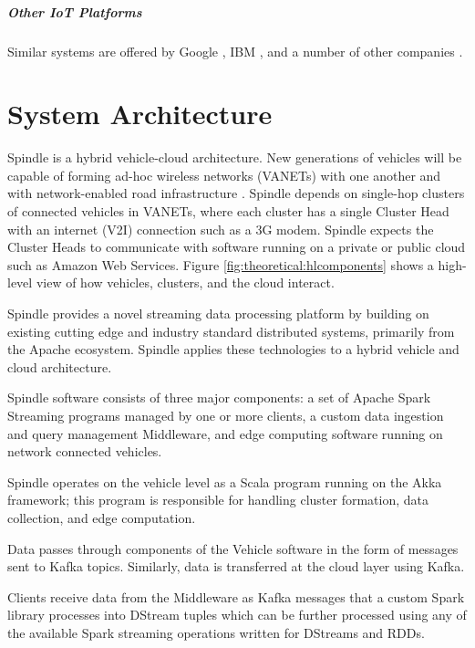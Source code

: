 \documentclass{thesis}
\begin{document}
        \paragraph{Other IoT Platforms}
            Similar systems are offered by Google \cite{google:iot}, IBM \cite{ibm:iot}, and a number of other companies
            \cite{forbes:iot}.

\chapter{System Architecture}
    Spindle is a hybrid vehicle-cloud architecture. New generations of vehicles
    will be capable of forming ad-hoc wireless networks (VANETs) with one another and
    with network-enabled road infrastructure \cite{vanets:overview}. Spindle depends
    on single-hop clusters of connected vehicles in VANETs, where each cluster has a
    single Cluster Head with an internet (V2I) connection such as a 3G modem. Spindle
    expects the Cluster Heads to communicate with software running on a private or 
    public cloud such as Amazon Web Services. Figure \ref{fig:theoretical:hlcomponents}
    shows a high-level view of how vehicles, clusters, and the cloud interact.

    Spindle provides a novel streaming data processing platform by building on
    existing cutting edge and industry standard distributed systems, primarily
    from the Apache ecosystem. Spindle applies these technologies to a hybrid
    vehicle and cloud architecture.

    Spindle software consists of three major components: a set of Apache Spark %
    Streaming \cite{spark:streaming} programs managed by one or more clients, a custom data ingestion and
    query management Middleware, and edge computing software running on network
    connected vehicles.
    
    Spindle operates on the vehicle level as a Scala
    \cite{scala} program running on the Akka \cite{akka} framework; this program
    is responsible for handling cluster formation, data collection, and edge
    computation.

    Data passes through components of the Vehicle software in the form of 
    messages sent to Kafka \cite{kafka} topics. Similarly, data is transferred
    at the cloud layer using Kafka.

    Clients receive data from the Middleware as Kafka messages that a custom Spark \cite{spark}
    library processes into DStream tuples which can be further processed using any of the available
    Spark streaming operations written for DStreams and RDDs.
\end{document}
